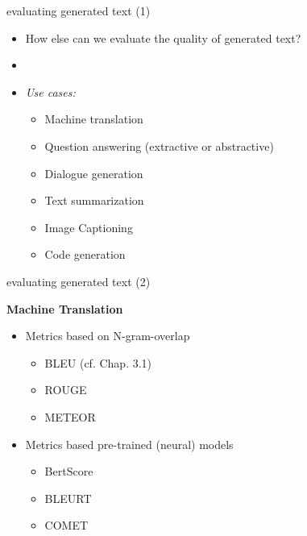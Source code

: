 \documentclass[11pt,compress,t,notes=noshow, xcolor=table]{beamer}
\begin{document}

\begin{frame}{evaluating generated text (1)}

\vfill

\begin{itemize}
	\item \ques How else can we evaluate the quality of generated text?
	\item[]
	\item \textit{Use cases:} 
			\begin{itemize}
				\item Machine translation
				\item Question answering (extractive or abstractive)
				\item Dialogue generation
				\item Text summarization
				\item Image Captioning
				\item Code generation
			\end{itemize}
\end{itemize}

\vfill

\end{frame}


\begin{frame}{evaluating generated text (2)}

\vfill

\textbf{Machine Translation}

\begin{itemize}
	\item Metrics based on N-gram-overlap
			\begin{itemize}
				\item BLEU (cf. Chap. 3.1) 
				\item ROUGE 
				\item METEOR 
			\end{itemize}
	\item Metrics based pre-trained (neural) models
			\begin{itemize}
				\item BertScore 
				\item BLEURT 
				\item COMET 
			\end{itemize}
\end{itemize}

\vfill

\end{frame}
\end{document}
